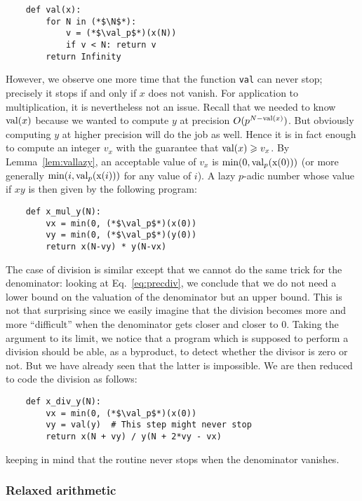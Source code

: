 \documentclass[11pt]{article}
\numberwithin{equation}{section}
\numberwithin{figure}{section}
\renewcommand{\geq}{\geqslant}
\theoremstyle{definition}
\newcommand{\N}{\mathbb N}
\renewcommand{\min}{\text{\rm min}}
\newcommand{\val}{\text{\rm val}}
\newcommand{\ttx}{\texttt{\rm x}\xspace}
\begin{document}
\begin{lstlisting}
    def val(x):
        for N in (*$\N$*):
            v = (*$\val_p$*)(x(N))
            if v < N: return v
        return Infinity
\end{lstlisting}

\noindent
However, we observe one more time that the function \texttt{val} can 
never stop; precisely it stops if and only if $x$ does not vanish.
For application to multiplication, it is nevertheless not an issue.
Recall that we needed to know $\val(x)$ because we wanted to compute
$y$ at precision $O(p^{N-\val(x)})$. But obviously computing $y$ at
higher precision will do the job as well. Hence it is in fact enough
to compute an integer $v_x$ with the guarantee that $\val(x) \geq
v_x$. By Lemma~\ref{lem:vallazy}, an acceptable value of $v_x$ is
$\min(0, \val_p(\ttx(0)))$ (or more generally $\min(i, \val_p(\ttx(i)))$ 
for any value of $i$).
A lazy $p$-adic number whose value if $xy$ is then given by the
following program:

\begin{lstlisting}
    def x_mul_y(N):
        vx = min(0, (*$\val_p$*)(x(0))
        vy = min(0, (*$\val_p$*)(y(0))
        return x(N-vy) * y(N-vx)
\end{lstlisting}

The case of division is similar except that we cannot do the same
trick for the denominator: looking at Eq.~\eqref{eq:precdiv}, we 
conclude that we do not need a lower bound on the valuation of
the denominator but an upper bound.
This is not that surprising since we easily imagine that the division
becomes more and more ``difficult'' when the denominator gets closer 
and closer to $0$. Taking the argument to its limit, we notice that
a program which is supposed to perform a division should be able, as 
a byproduct, to detect whether the divisor is zero or not. But we 
have already seen that the latter is impossible.
We are then reduced to code the division as follows:

\begin{lstlisting}
    def x_div_y(N):
        vx = min(0, (*$\val_p$*)(x(0))
        vy = val(y)  # This step might never stop
        return x(N + vy) / y(N + 2*vy - vx)
\end{lstlisting}

\noindent
keeping in mind that the routine never stops when the denominator 
vanishes.

\subsubsection{Relaxed arithmetic}
\end{document}
